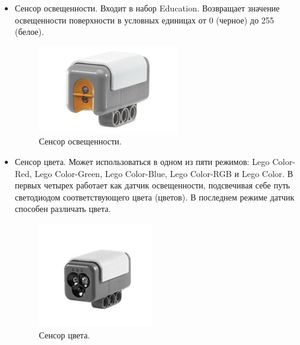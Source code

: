 \begin{itemize}
	\item Сенсор освещенности. Входит в набор Education. Возвращает значение освещенности поверхности в условных единицах от 0 (черное) до 255 (белое).
	\begin{figure}[h!]
		\begin{center}
			\includegraphics[width=0.6\linewidth]{chapters/chapter2/images/9}
			\caption{Сенсор освещенности.}
			\label{ris:image2x9}
		\end{center}
	\end{figure}
	
	\item Сенсор цвета. Может использоваться в одном из пяти режимов: Lego Color-Red, Lego Color-Green, Lego Color-Blue, Lego Color-RGB и Lego Color. В первых четырех работает как датчик освещенности, подсвечивая себе путь светодиодом соответствующего цвета (цветов). В последнем режиме датчик способен различать цвета.
	\begin{figure}[h!]
		\begin{center}
			\includegraphics[width=0.6\linewidth]{chapters/chapter2/images/10}
			\caption{Сенсор цвета.}
			\label{ris:image2x10}
		\end{center}
	\end{figure}
\end{itemize}

{\hypertarget{lesson2x3}{}}\\\\

